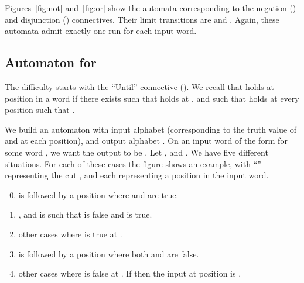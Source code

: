 \documentclass[envcountsame]{fsttcs-ps}
\newcommand{\until}{{Until}\xspace}
\begin{document}
Figures~\ref{fig:not} and~\ref{fig:or} show the automata corresponding to the
negation () and disjunction () connectives.  Their limit
transitions are  and .  Again, these
automata admit exactly one run for each input word.


\begin{figure}[h]
\begin{center}
\end{center}
\end{figure}





\subsection{Automaton for }

The difficulty starts with the ``\until'' connective ().  We recall
that  holds at position  in a word  if there exists
 such that  holds at , and such that  holds at every
position  such that .

We build an automaton  with input alphabet 
(corresponding to the truth value of  and  at each position), and
output alphabet .  On an input word of the form
 for some word , we want the output
to be .
Let , and .  We have five different situations.  For
each of these cases the figure shows an example, with ``''
representing the cut , and each  representing a position in the input
word.

\begin{enumerate}
\setcounter{enumi}{-1}
\item  is followed by a position where  and  are true.\hfill
\item , and  is such that  is false and  is
true.
\hfill


\item other cases where  is true at .
\hfill


\item  is followed by a position where both  and  are false.
\hfill


\item other cases where  is false at .  If 
then the input at position  is .


\end{enumerate}
\end{document}
